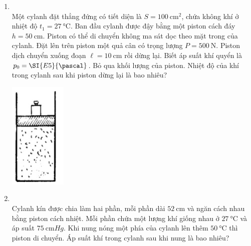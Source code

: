 \begin{enumerate}[label=\bfseries Câu \arabic*:, leftmargin=1.7cm]
	
	\item {}\\
	Một cylanh đặt thẳng đứng có tiết diện là $S=\SI{100}{\centi\meter^2}$, chứa không khí ở nhiệt độ $t_1=\SI{27}{\celsius}$. Ban đầu cylanh được đậy bằng một piston cách đáy $h=\SI{50}{\centi\meter}$. Piston có thể di chuyển không ma sát dọc theo mặt trong của cylanh. Đặt lên trên piston một quả cân có trọng lượng $P=\SI{500}{\newton}$. Piston dịch chuyển xuống đoạn $\ell=\SI{10}{\centi\meter}$ rồi dừng lại. Biết áp suất khí quyển là $p_0=\SI{E5}{\pascal}$. Bỏ qua khối lượng của piston. Nhiệt độ của khí trong cylanh sau khi piston dừng lại là bao nhiêu?
	\begin{center}
		\includegraphics[width=0.15\linewidth]{../figs/VN12-Y24-PH-SYL-012P-3}
	\end{center}

\item {}\\
Cylanh kín được chia làm hai phần, mỗi phần dài $\SI{52}{\centi\meter}$ và ngăn cách nhau bằng piston cách nhiệt. Mỗi phần chứa một lượng khí giống nhau ở $\SI{27}{\celsius}$ và áp suất $\SI{75}{\centi\meter Hg}$. Khi nung nóng một phía của cylanh lên thêm $\SI{50}{\celsius}$ thì piston di chuyển. Áp suất khí trong cylanh sau khi nung là bao nhiêu?



\end{enumerate}

